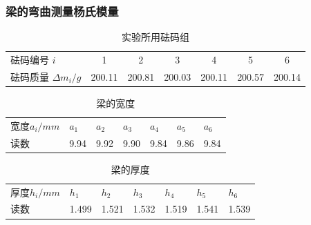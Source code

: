 \documentclass{ctexart}
\begin{document}
\subsubsection{梁的弯曲测量杨氏模量}
\begin{table}[H]
  \centering
  \caption{实验所用砝码组}
    \begin{tabular}{lcccccc}
    砝码编号 $i$ & 1     & 2     & 3     & 4     & 5     & 6 \\
    砝码质量 $\Delta m_i /g$ & 200.11 & 200.81 & 200.03 & 200.11 & 200.57 & 200.14 \\
    \end{tabular}%
  \label{tab:addlabel}%
\end{table}%
\begin{table}[H]
  \centering
  \caption{梁的宽度}
    \begin{tabular}{lcccccc}
    宽度$a_i/mm$ & \multicolumn{1}{l}{$a_1$} & \multicolumn{1}{l}{$a_2$} & \multicolumn{1}{l}{$a_3$} & \multicolumn{1}{l}{$a_4$} & \multicolumn{1}{l}{$a_5$} & \multicolumn{1}{l}{$a_6$} \\
    读数    & 9.94  & 9.92  & 9.90  & 9.84  & 9.86  & 9.84  \\
    \end{tabular}%
  \label{tab:addlabel}%
\end{table}%
\begin{table}[H]
  \centering
  \caption{梁的厚度}
    \begin{tabular}{lrrrrrr}
    厚度$h_i/mm$ & \multicolumn{1}{l}{$h_1$} & \multicolumn{1}{l}{$h_2$} & \multicolumn{1}{l}{$h_3$} & \multicolumn{1}{l}{$h_4$} & \multicolumn{1}{l}{$h_5$} & \multicolumn{1}{l}{$h_6$} \\
    读数    & 1.499 & 1.521 & 1.532 & 1.519 & 1.541 & 1.539 \\
    \end{tabular}%
  \label{tab:addlabel}%
\end{table}%
\end{document}
